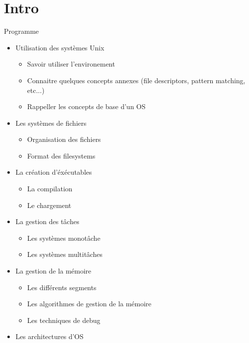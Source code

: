 %
%
%

\part{Intro}

\begin{frame}[fragile=singleslide]{Programme}
  \begin{itemize} 
  \item Utilisation des systèmes Unix
    \begin{itemize}
    \item Savoir utiliser l'environement
    \item  Connaitre  quelques  concepts  annexes  (file  descriptors,
      pattern matching, etc...)
    \item Rappeller les concepts de base d'un OS
    \end{itemize}
  \item Les systèmes de fichiers
    \begin{itemize}
      \item Organisation des fichiers
      \item Format des filesystems
    \end{itemize}
  \item La création d'éxécutables
    \begin{itemize} 
    \item La compilation
    \item Le chargement
    \end{itemize}
  \item La gestion des tâches
    \begin{itemize}
    \item Les systèmes monotâche
    \item Les systèmes multitâches 
    \end{itemize}
  \item La gestion de la mémoire
    \begin{itemize}
    \item Les différents segments
    \item Les algorithmes de gestion de la mémoire
    \item Les techniques de debug
    \end{itemize}
  \item Les architectures d'OS
  \end{itemize}
\end{frame}

